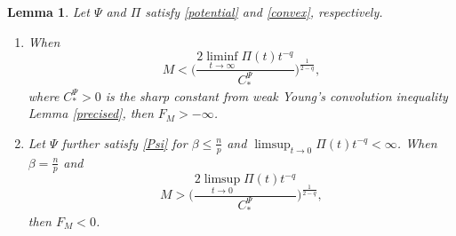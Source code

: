 \documentclass[reqno,11pt]{amsart}
\numberwithin{equation}{section}
\newtheorem{lemma}[theorem]{Lemma}
\theoremstyle{definition}
\begin{document}
\begin{lemma}\label{negative}
Let $\Psi$ and $\Pi$ satisfy \eqref{potential} and \eqref{convex}, respectively.
\begin{enumerate}
    \item[{\rm(}a{\rm)}] When
    \begin{equation}\label{masscond}
    M < \bigg ( \frac{2 \liminf_{t \to \infty} \Pi(t) t^{-q}}{C_*^\Psi} \bigg )^\frac{1}{2-q},
    \end{equation}
    where $C_*^\Psi>0$ is the sharp constant from weak Young's convolution inequality {\rm Lemma \ref{precised}}, then $F_M > - \infty$.

    \item[{\rm(}b{\rm)}] Let $\Psi$ further satisfy \eqref{Psi} 
    for $\beta \leq \frac{n}{p}$ and $\limsup_{t \to 0} \Pi(t) t^{-q} < \infty$. 
    When $\beta = \frac{n}{p}$ and
    $$
    M > \bigg ( \frac{2 \limsup_{t \to 0} \Pi(t) t^{-q}}{C_*^\Psi} \bigg )^\frac{1}{2-q},
    $$
    then $F_M < 0$.
\end{enumerate}
\end{lemma}
\end{document}
